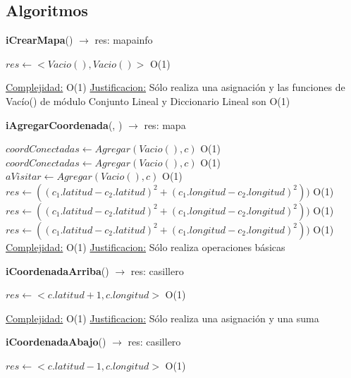 \subsection{Algoritmos}
\begin{Algoritmos}

\begin{algorithm}[H]{\textbf{iCrearMapa}() $\to$ res: mapainfo}
	\begin{algorithmic}[1]
		\State $res \gets <Vacio(), Vacio()>$ \Comment O(1)
		
		\medskip
		\Statex \underline{Complejidad:} O(1)
			\Statex \underline{Justificacion:} Sólo realiza una asignación y las funciones de Vac\'io() de m\'odulo Conjunto Lineal y Diccionario Lineal son O(1)
	\end{algorithmic}
\end{algorithm}

\begin{algorithm}[H]{\textbf{iAgregarCoordenada}(, ) $\to$ res: mapa}
	\begin{algorithmic}[1]
		\State $coordConectadas \gets Agregar(Vacio(), c)$ \Comment O(1)
		\State $coordConectadas \gets Agregar(Vacio(), c)$ \Comment O(1)
		\State $aVisitar \gets Agregar(Vacio(), c)$ \Comment O(1)
		\State $res \gets ((c_1.latitud - c_2.latitud)^{2} + (c_1.longitud  - c_2.longitud)^{2}))$ \Comment O(1)
		\State $res \gets ((c_1.latitud - c_2.latitud)^{2} + (c_1.longitud  - c_2.longitud)^{2}))$ \Comment O(1)
		\State $res \gets ((c_1.latitud - c_2.latitud)^{2} + (c_1.longitud  - c_2.longitud)^{2}))$ \Comment O(1)
				\medskip
		\Statex \underline{Complejidad:} O(1)
			\Statex \underline{Justificacion:} Sólo realiza operaciones básicas
	\end{algorithmic}
\end{algorithm}

\begin{algorithm}[H]{\textbf{iCoordenadaArriba}() $\to$ res: casillero}
	\begin{algorithmic}[1]
		\State $res \gets <c.latitud +1, c.longitud>$ \Comment O(1)
		
		\medskip
		\Statex \underline{Complejidad:} O(1)
			\Statex \underline{Justificacion:} Sólo realiza una asignación y una suma
	\end{algorithmic}
\end{algorithm}

\begin{algorithm}[H]{\textbf{iCoordenadaAbajo}() $\to$ res: casillero}
	\begin{algorithmic}[1]
		\State $res \gets <c.latitud -1, c.longitud>$ \Comment O(1)
		

\end{algorithmic}
\end{algorithm}
\end{Algoritmos}
